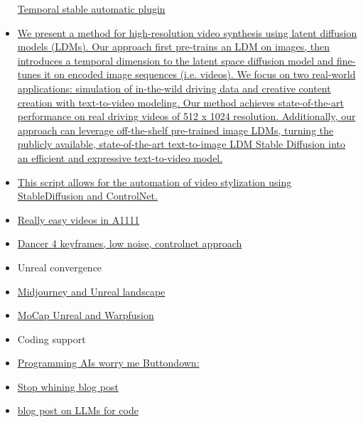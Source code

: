 \begin{itemize}
  \href{https://www.reddit.com/r/StableDiffusion/comments/12sd4bi/results_from_latest_version_of_temporal_stable/}{Temporal
  stable automatic plugin}
\item
  \href{https://buff.ly/41FgQrb}{We present a method for high-resolution
  video synthesis using latent diffusion models (LDMs). Our approach
  first pre-trains an LDM on images, then introduces a temporal
  dimension to the latent space diffusion model and fine-tunes it on
  encoded image sequences (i.e. videos). We focus on two real-world
  applications: simulation of in-the-wild driving data and creative
  content creation with text-to-video modeling. Our method achieves
  state-of-the-art performance on real driving videos of 512 x 1024
  resolution. Additionally, our approach can leverage off-the-shelf
  pre-trained image LDMs, turning the publicly available,
  state-of-the-art text-to-image LDM Stable Diffusion into an efficient
  and expressive text-to-video model.}
\item
  \href{https://github.com/volotat/SD-CN-Animation}{This script allows
  for the automation of video stylization using StableDiffusion and
  ControlNet.}
\item
  \href{https://www.reddit.com/r/StableDiffusion/comments/12otdo0/the_secret_to_really_easy_videos_in_a1111_easier/}{Really
  easy videos in A1111}
\item
  \href{https://www.reddit.com/r/StableDiffusion/comments/12nwpdx/dancer_4_keyframes_guide_and_source_files_for/}{Dancer
  4 keyframes, low noise, controlnet approach}
\item
  Unreal convergence
\item
  \href{https://www.linkedin.com/posts/eric-vyacheslav-156273169_an-amazing-landscape-animation-created-in-activity-7021136593314791424-fq_C/?originalSubdomain=lt}{Midjourney
  and Unreal landscape}
\item
  \href{https://www.reddit.com/r/StableDiffusion/comments/10rr99t/mocap_unreal_engine_warpfusion/}{MoCap
  Unreal and Warpfusion}
\item
  Coding support
\item
  \href{https://buttondown.email/hillelwayne/archive/programming-ais-worry-me/}{Programming
  AIs worry me   Buttondown:}
\item
  \href{https://about.sourcegraph.com/blog/cheating-is-all-you-need}{Stop
  whining blog post}
\item
  \href{https://evanthebouncy.github.io/program-synthesis-minimal/generation-with-llm/}{blog
  post on LLMs for code}

\end{itemize}

